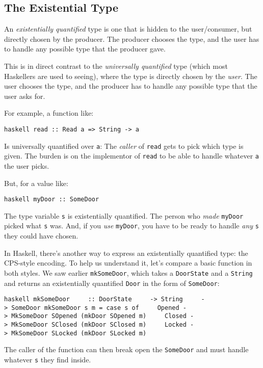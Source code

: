 \documentclass[]{article}
\begin{document}
\subsection{The Existential Type}

An \emph{existentially quantified} type is one that is hidden to the
user/consumer, but directly chosen by the producer. The producer chooses the
type, and the user has to handle any possible type that the producer gave.

This is in direct contrast to the \emph{universally quantified} type (which most
Haskellers are used to seeing), where the type is directly chosen by the
\emph{user}. The user chooses the type, and the producer has to handle any
possible type that the user asks for.

For example, a function like:

\texttt{haskell\ read\ ::\ Read\ a\ =\textgreater{}\ String\ -\textgreater{}\ a}

Is universally quantified over \texttt{a}: The \emph{caller} of \texttt{read}
gets to pick which type is given. The burden is on the implementor of
\texttt{read} to be able to handle whatever \texttt{a} the user picks.

But, for a value like:

\texttt{haskell\ myDoor\ ::\ SomeDoor}

The type variable \texttt{s} is existentially quantified. The person who
\emph{made} \texttt{myDoor} picked what \texttt{s} was. And, if you \emph{use}
\texttt{myDoor}, you have to be ready to handle \emph{any} \texttt{s} they could
have chosen.

In Haskell, there's another way to express an existentially quantified type: the
CPS-style encoding. To help us understand it, let's compare a basic function in
both styles. We saw earlier \texttt{mkSomeDoor}, which takes a
\texttt{DoorState} and a \texttt{String} and returns an existentially quantified
\texttt{Door} in the form of \texttt{SomeDoor}:

\texttt{haskell\ mkSomeDoor\ \ \ \ \ ::\ DoorState\ \ \ \ \ -\textgreater{}\ String\ \ \ \ \ -\textgreater{}\ SomeDoor\ mkSomeDoor\ s\ m\ =\ case\ s\ of\ \ \ \ \ Opened\ -\textgreater{}\ MkSomeDoor\ SOpened\ (mkDoor\ SOpened\ m)\ \ \ \ \ Closed\ -\textgreater{}\ MkSomeDoor\ SClosed\ (mkDoor\ SClosed\ m)\ \ \ \ \ Locked\ -\textgreater{}\ MkSomeDoor\ SLocked\ (mkDoor\ SLocked\ m)}

The caller of the function can then break open the \texttt{SomeDoor} and must
handle whatever \texttt{s} they find inside.
\end{document}
